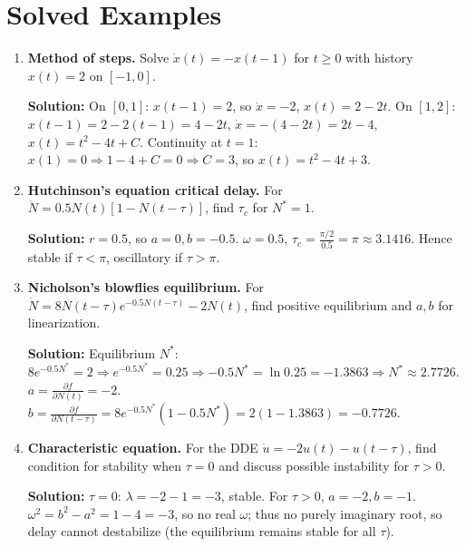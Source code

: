 \documentclass[12pt,a4paper]{book}
\begin{document}
\section{Solved Examples}
\begin{enumerate}[leftmargin=*, label=\textbf{Example 5.\arabic*}]
    \item \textbf{Method of steps.}
    Solve $\dot{x}(t) = -x(t-1)$ for $t\ge0$ with history $x(t)=2$ on $[-1,0]$.

    \textbf{Solution:}
    On $[0,1]$: $x(t-1)=2$, so $\dot{x} = -2$, $x(t) = 2 - 2t$.
    On $[1,2]$: $x(t-1) = 2 - 2(t-1) = 4 - 2t$, $\dot{x} = -(4-2t) = 2t-4$, $x(t) = t^2 - 4t + C$. Continuity at $t=1$: $x(1)=0 \Rightarrow 1 -4 + C = 0 \Rightarrow C=3$, so $x(t) = t^2 -4t + 3$.

    \item \textbf{Hutchinson’s equation critical delay.}
    For $\dot{N} = 0.5 N(t) [1 - N(t-\tau)]$, find $\tau_c$ for $N^*=1$.

    \textbf{Solution:} $r=0.5$, so $a=0, b=-0.5$. $\omega = 0.5$, $\tau_c = \frac{\pi/2}{0.5} = \pi \approx 3.1416$. Hence stable if $\tau < \pi$, oscillatory if $\tau > \pi$.

    \item \textbf{Nicholson’s blowflies equilibrium.}
    For $\dot{N} = 8 N(t-\tau) e^{-0.5 N(t-\tau)} - 2 N(t)$, find positive equilibrium and $a,b$ for linearization.

    \textbf{Solution:} Equilibrium $N^*$: $8 e^{-0.5 N^*} = 2 \Rightarrow e^{-0.5 N^*} = 0.25 \Rightarrow -0.5 N^* = \ln 0.25 = -1.3863 \Rightarrow N^* \approx 2.7726$.
    $a = \frac{\partial f}{\partial N(t)} = -2$.
    $b = \frac{\partial f}{\partial N(t-\tau)} = 8 e^{-0.5 N^*}(1 - 0.5 N^*) = 2 (1 - 1.3863) = -0.7726$.

    \item \textbf{Characteristic equation.}
    For the DDE $\dot{u} = -2 u(t) - u(t-\tau)$, find condition for stability when $\tau=0$ and discuss possible instability for $\tau>0$.

    \textbf{Solution:} $\tau=0$: $\lambda = -2 -1 = -3$, stable. For $\tau>0$, $a=-2, b=-1$. $\omega^2 = b^2 - a^2 = 1 - 4 = -3$, so no real $\omega$; thus no purely imaginary root, so delay cannot destabilize (the equilibrium remains stable for all $\tau$).
\end{enumerate}
\end{document}

